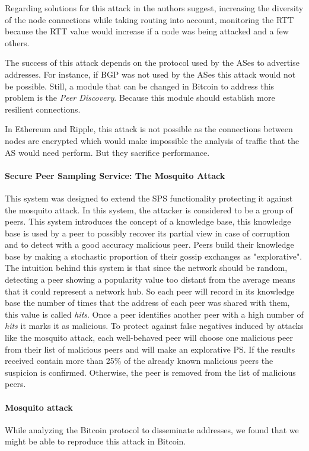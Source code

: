 Regarding solutions for this attack in \cite{apostolaki2016hijacking} the authors suggest, increasing the diversity of the node connections while taking routing into account, monitoring the RTT because the RTT value would increase if a node was being attacked and a few others.

The success of this attack depends on the protocol used by the ASes to advertise addresses. For instance, if BGP was not used by the ASes this attack would not be possible. Still, a module that can be changed in Bitcoin to address this problem is the \textit{Peer Discovery}. Because this module should establish more resilient connections.

In Ethereum and Ripple, this attack is not possible as the connections between nodes are encrypted which would make impossible the analysis of traffic that the AS would need perform. But they sacrifice performance.


\paragraph*{\textbf{Secure Peer Sampling Service: The Mosquito Attack} \cite{jesi2009secure}} This system was designed to extend the SPS functionality protecting it against the mosquito attack. In this system, the attacker is considered to be a group of peers. This system introduces the concept of a knowledge base, this knowledge base is used by a peer to possibly recover its partial view in case of corruption and to detect with a good accuracy malicious peer. Peers build their knowledge base by making a stochastic proportion of their gossip exchanges as "explorative". The intuition behind this system is that since the network should be random, detecting a peer showing a popularity value too distant from the average means that it could represent a network hub. So each peer will record in its knowledge base the number of times that the address of each peer was shared with them, this value is called \textit{hits}. Once a peer identifies another peer with a high number of \textit{hits} it marks it as malicious. To protect against false negatives induced by attacks like the mosquito attack, each well-behaved peer will choose one malicious peer from their list of malicious peers and will make an explorative PS. If the results received contain more than 25\% of the already known malicious peers the suspicion is confirmed. Otherwise, the peer is removed from the list of malicious peers.

\paragraph*{\textbf{Mosquito attack}} While analyzing the Bitcoin protocol to disseminate addresses, we found that we might be able to reproduce this attack in Bitcoin.

